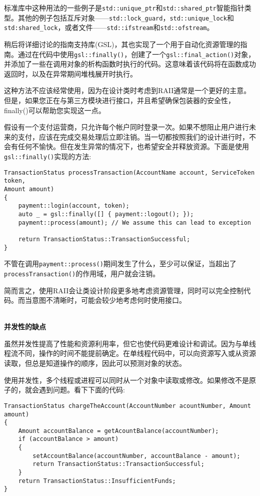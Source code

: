 标准库中这种用法的一些例子是\texttt{std::unique\_ptr}和\texttt{std::shared\_ptr}智能指针类型。其他的例子包括互斥对象——\texttt{std::lock\_guard}，\texttt{std::unique\_lock}和\texttt{std:shared\_lock}，或者文件——\texttt{std::ifstream}和\texttt{std::ofstream}。

稍后将详细讨论的指南支持库(GSL)，其也实现了一个用于自动化资源管理的指南。通过在代码中使用\texttt{gsl::finally()}，创建了一个\texttt{gsl::final\_action()}对象，并添加了一些在调用对象的析构函数时执行的代码。这意味着该代码将在函数成功返回时，以及在异常期间堆栈展开时执行。

这种方法不应该经常使用，因为在设计类时考虑到RAII通常是一个更好的主意。但是，如果您正在与第三方模块进行接口，并且希望确保包装器的安全性，finally()可以帮助您实现这一点。

假设有一个支付运营商，只允许每个帐户同时登录一次。如果不想阻止用户进行未来的支付，应该在完成交易处理后立即注销。当一切都按照我们的设计进行时，不会有任何不愉快。但在发生异常的情况下，也希望安全并释放资源。下面是使用\texttt{gsl::finally()}实现的方法:

\begin{lstlisting}[style=styleCXX]
TransactionStatus processTransaction(AccountName account, ServiceToken
token,
Amount amount)
{
	payment::login(account, token);
	auto _ = gsl::finally([] { payment::logout(); });
	payment::process(amount); // We assume this can lead to exception
	
	return TransactionStatus::TransactionSuccessful;
}
\end{lstlisting}

不管在调用\texttt{payment::process()}期间发生了什么，至少可以保证，当超出了\texttt{processTransaction()}的作用域，用户就会注销。

简而言之，使用RAII会让类设计阶段更多地考虑资源管理，同时可以完全控制代码。而当意图不清晰时，可能会较少地考虑何时使用接口。

\hspace*{\fill} \\ %
\noindent
\textbf{并发性的缺点}

虽然并发性提高了性能和资源利用率，但它也使代码更难设计和调试。因为与单线程流不同，操作的时间不能提前确定。在单线程代码中，可以向资源写入或从资源读取，但总是知道操作的顺序，因此可以预测对象的状态。

使用并发性，多个线程或进程可以同时从一个对象中读取或修改。如果修改不是原子的，就会遇到问题。看下下面的代码:

\begin{lstlisting}[style=styleCXX]
TransactionStatus chargeTheAccount(AccountNumber acountNumber, Amount
amount)
{
	Amount accountBalance = getAcountBalance(accountNumber);
	if (accountBalance > amount)
	{
		setAccountBalance(accountNumber, accountBalance - amount);
		return TransactionStatus::TransactionSuccessful;
	}
	return TransactionStatus::InsufficientFunds;
}
\end{lstlisting}

